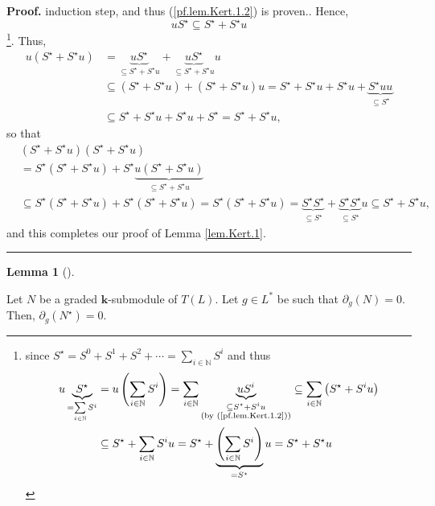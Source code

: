 \documentclass[numbers=enddot,12pt,final,onecolumn,notitlepage]{scrartcl}%
\theoremstyle{definition}
\newtheorem{lem}[theo]{Lemma}
\newenvironment{lemma}[1][]
{\begin{lem}[#1]\begin{leftbar}}
{\end{leftbar}\end{lem}}
\newenvironment{proof}[1][Proof]{\noindent\textbf{#1.} }{\ \rule{0.5em}{0.5em}}
\let\sumnonlimits\sum
\renewcommand{\sum}{\sumnonlimits\limits}
\begin{document}
\begin{proof}
{induction step, and thus (\ref{pf.lem.Kert.1.2}) is proven.}. Hence,%
\[
uS^{\star}\subseteq S^{\star}+S^{\star}u
\]
\footnote{since $S^{\star}=S^{0}+S^{1}+S^{2}+\cdots=\sum_{i\in\mathbb{N}}%
S^{i}$ and thus%
\begin{align*}
u\underbrace{S^{\star}}_{=\sum_{i\in\mathbb{N}}S^{i}}  &  =u\left(  \sum
_{i\in\mathbb{N}}S^{i}\right)  =\sum_{i\in\mathbb{N}}\underbrace{uS^{i}%
}_{\substack{\subseteq S^{\star}+S^{i}u\\\text{(by (\ref{pf.lem.Kert.1.2}))}%
}}\subseteq\sum_{i\in\mathbb{N}}\left(  S^{\star}+S^{i}u\right) \\
&  \subseteq S^{\star}+\sum_{i\in\mathbb{N}}S^{i}u=S^{\star}%
+\underbrace{\left(  \sum_{i\in\mathbb{N}}S^{i}\right)  }_{=S^{\star}%
}u=S^{\star}+S^{\star}u
\end{align*}
}. Thus,%
\begin{align*}
u\left(  S^{\star}+S^{\star}u\right)   &  =\underbrace{uS^{\star}}_{\subseteq
S^{\star}+S^{\star}u}+\underbrace{uS^{\star}}_{\subseteq S^{\star}+S^{\star}%
u}u\\
&  \subseteq\left(  S^{\star}+S^{\star}u\right)  +\left(  S^{\star}+S^{\star
}u\right)  u=S^{\star}+S^{\star}u+S^{\star}u+\underbrace{S^{\star}%
uu}_{\subseteq S^{\star}}\\
&  \subseteq S^{\star}+S^{\star}u+S^{\star}u+S^{\star}=S^{\star}+S^{\star}u,
\end{align*}
so that%
\begin{align*}
&  \left(  S^{\star}+S^{\star}u\right)  \left(  S^{\star}+S^{\star}u\right) \\
&  =S^{\star}\left(  S^{\star}+S^{\star}u\right)  +S^{\star}%
\underbrace{u\left(  S^{\star}+S^{\star}u\right)  }_{\subseteq S^{\star
}+S^{\star}u}\\
&  \subseteq S^{\star}\left(  S^{\star}+S^{\star}u\right)  +S^{\star}\left(
S^{\star}+S^{\star}u\right)  =S^{\star}\left(  S^{\star}+S^{\star}u\right)
=\underbrace{S^{\star}S^{\star}}_{\subseteq S^{\star}}+\underbrace{S^{\star
}S^{\star}}_{\subseteq S^{\star}}u\subseteq S^{\star}+S^{\star}u,
\end{align*}
and this completes our proof of Lemma \ref{lem.Kert.1}.
\end{proof}

\begin{lemma}
\label{lem.Kert.deriv0.gen} Let $N$ be a graded $\mathbf{k}$-submodule of
$T\left(  L\right)  $. Let $g\in L^{\ast}$ be such that $\partial_{g}\left(  N
\right)  =0$. Then, $\partial_{g}\left(  N^{\star}\right)  = 0$.
\end{lemma}
\end{document}
